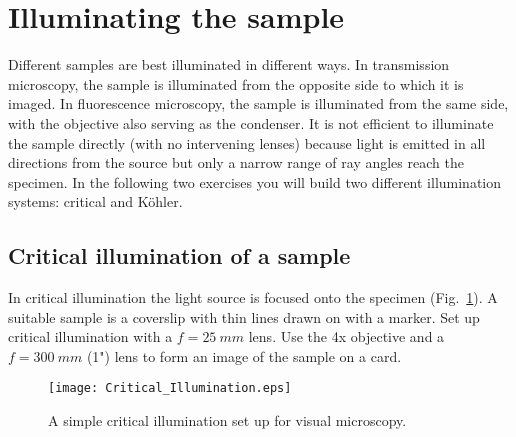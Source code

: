 \documentclass[a4paper]{report}
\begin{document}
\clearpage
\section{Illuminating the sample}
Different samples are best illuminated in different ways.
In transmission microscopy, the sample is illuminated from the opposite side to which it is imaged. 
In fluorescence microscopy, the sample is illuminated from the same side, with the objective also serving as the condenser. 
It is not efficient to illuminate the sample directly (with no intervening lenses) because light is emitted in all directions from the source but only a narrow range of ray angles reach the specimen. 
In the following two exercises you will build two different illumination systems: critical and K\"{o}hler. 


\subsection{Critical illumination of a sample}
In critical illumination the light source is focused onto the specimen (Fig.~\ref{critIlum}).
A suitable sample is a coverslip with thin lines drawn on with a marker.
Set up critical illumination with a $f=25~mm$ lens. Use the 4x objective and a $f=300~mm$ (1") lens to form an image of the sample on a card.

\begin{figure}[h]
\center
\texttt{[image: Critical\_Illumination.eps]}
\caption{A simple critical illumination set up for visual microscopy.}
\label{critIlum}
\end{figure}
\end{document}
